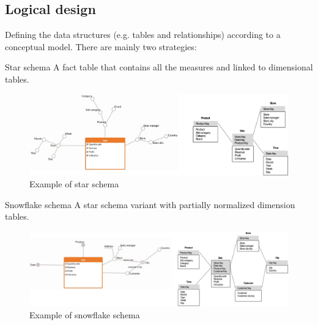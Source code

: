 \subsection{Logical design}
Defining the data structures (e.g. tables and relationships) according to a conceptual model.
There are mainly two strategies:
\begin{descriptionlist}
    \item[Star schema] 
        A fact table that contains all the measures and linked to dimensional tables.
        \begin{figure}[ht]
            \centering
            \includegraphics[width=\textwidth]{img/logical_star_schema.png}
            \caption{Example of star schema}
        \end{figure}

    \item[Snowflake schema] 
        A star schema variant with partially normalized dimension tables.
        \begin{figure}[ht]
            \centering
            \includegraphics[width=\textwidth]{img/logical_snowflake_schema.png}
            \caption{Example of snowflake schema}
        \end{figure}
\end{descriptionlist}




